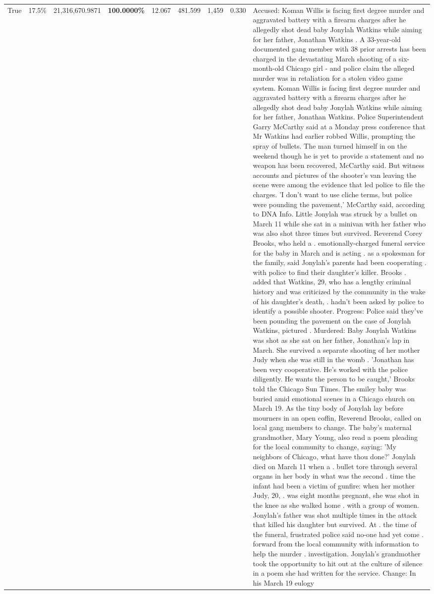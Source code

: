 \begin{table}[H]
\begin{tabular}{lllrlllll}
True & 17.5\% & 21,316,670.9871 & \bfseries \color{red} 100.0000\% & 12.067 & 481.599 & 1,459 & 0.330 & Accused: Koman Willis is facing first degree murder and aggravated battery with a firearm charges after he allegedly shot dead baby Jonylah Watkins while aiming for her father, Jonathan Watkins . A 33-year-old documented gang member with 38 prior arrests has been charged in the devastating March shooting of a six-month-old Chicago girl - and police claim the alleged murder was in retaliation for a stolen video game system. Koman Willis is facing first degree murder and aggravated battery with a firearm charges after he allegedly shot dead baby Jonylah Watkins while aiming for her father, Jonathan Watkins. Police Superintendent Garry McCarthy said at a Monday press conference that Mr Watkins had earlier robbed Willis, prompting the spray of bullets. The man turned himself in on the weekend though he is yet to provide a statement and no weapon has been recovered, McCarthy said. But witness accounts and pictures of the shooter's van leaving the scene were among the evidence that led police to file the charges. 'I don't want to use cliche terms, but police were pounding the pavement,' McCarthy said, according to DNA Info. Little Jonylah was struck by a bullet on March 11 while she sat in a minivan with her father who was also shot three times but survived. Reverend Corey Brooks, who held a . emotionally-charged funeral service for the baby in March and is acting . as a spokesman for the family, said Jonylah's parents had been cooperating . with police to find their daughter's killer. Brooks . added that Watkins, 29, who has a lengthy criminal history and was criticized by the community in the wake of his daughter's death, . hadn't been asked by police to identify a possible shooter. Progress: Police said they've been pounding the pavement on the case of Jonylah Watkins, pictured . Murdered: Baby Jonylah Watkins was shot as she sat on her father, Jonathan's lap in March. She survived a separate shooting of her mother Judy when she was still in the womb . 'Jonathan has been very cooperative. He's worked with the police diligently. He wants the person to be caught,' Brooks told the Chicago Sun Times. The smiley baby was buried amid emotional scenes in a Chicago church on March 19. As the tiny body of Jonylah lay before mourners in an open coffin, Reverend Brooks, called on local gang members to change. The baby's maternal grandmother, Mary Young, also read a poem pleading for the local community to change, saying: 'My neighbors of Chicago, what have thou done?' Jonylah died on March 11 when a . bullet tore through several organs in her body in what was the second . time the infant had been a victim of gunfire: when her mother Judy, 20, . was eight months pregnant, she was shot in the knee as she walked home . with a group of women. Jonylah's father was shot multiple times in the attack that killed his daughter but survived. At . the time of the funeral, frustrated police said no-one had yet come . forward from the local community with information to help the murder . investigation. Jonylah's grandmother took the opportunity to hit out at the culture of silence in a poem she had written for the service. Change: In his March 19 eulogy 
\end{tabular}
\end{table}
